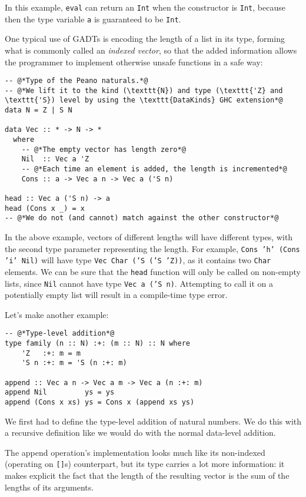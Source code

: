 In this example, \texttt{eval} can return an \texttt{Int} when the constructor is \texttt{Int}, because then the type variable \texttt{a} is guaranteed to be \texttt{Int}.

One typical use of GADTs is encoding the length of a list in its type, forming what is commonly called an \emph{indexed vector}, so that the added information allows the programmer to implement otherwise unsafe functions in a safe way:

\begin{lstlisting}[caption=A length-indexed vector]
-- @*Type of the Peano naturals.*@
-- @*We lift it to the kind (\texttt{N}) and type (\texttt{'Z} and \texttt{'S}) level by using the \texttt{DataKinds} GHC extension*@
data N = Z | S N

data Vec :: * -> N -> *
  where
    -- @*The empty vector has length zero*@
    Nil  :: Vec a 'Z
    -- @*Each time an element is added, the length is incremented*@
    Cons :: a -> Vec a n -> Vec a ('S n)

head :: Vec a ('S n) -> a
head (Cons x _) = x
-- @*We do not (and cannot) match against the other constructor*@
\end{lstlisting}

In the above example, vectors of different lengths will have different types, with the second type parameter representing the length.
For example, \texttt{Cons 'h' (Cons 'i' Nil)} will have type \texttt{Vec Char ('S ('S 'Z))}, as it contains two \texttt{Char} elements.
We can be sure that the \texttt{head} function will only be called on non-empty lists, since \texttt{Nil} cannot have type \texttt{Vec a ('S n)}.
Attempting to call it on a potentially empty list will result in a compile-time type error.

Let's make another example:

\begin{lstlisting}[caption=Appending a \texttt{Vec} to another]
-- @*Type-level addition*@
type family (n :: N) :+: (m :: N) :: N where
    'Z   :+: m = m
    'S n :+: m = 'S (n :+: m)

append :: Vec a n -> Vec a m -> Vec a (n :+: m)
append Nil         ys = ys
append (Cons x xs) ys = Cons x (append xs ys)
\end{lstlisting}

We first had to define the type-level addition of natural numbers. We do this with a recursive definition like we would do with the normal data-level addition.

The append operation's implementation looks much like its non-indexed (operating on \texttt{[]}s) counterpart, but its type carries a lot more information: it makes explicit the fact that the length of the resulting vector is the sum of the lengths of its arguments.

